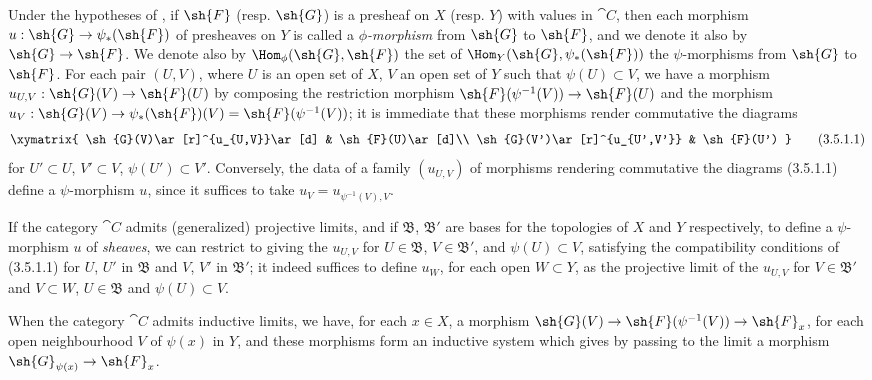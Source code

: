 \begin{env}[3.5.1]
\label{0.3.5.1}
Under the hypotheses of , if $\sh{F}$ (resp. $\sh{G}$) is a
presheaf on $X$ (resp. $Y$) with values in $\cat{C}$, then each morphism
$u:\sh{G}\to\psi_*(\sh{F})$ of presheaves on $Y$ is called a
\emph{$\phi$-morphism} from $\sh{G}$ to $\sh{F}$, and we denote it also by
$\sh{G}\to\sh{F}$. We denote also by $\Hom_\phi(\sh{G},\sh{F})$ the set of
$\Hom_Y(\sh{G},\psi_*(\sh{F}))$ the $\psi$-morphisms from $\sh{G}$ to $\sh{F}$.
For each pair $(U,V)$, where $U$ is an open set of $X$, $V$ an open set of $Y$
such that $\psi(U)\subset V$, we have a morphism $u_{U,V}:\sh{G}(V)\to\sh{F}(U)$
by composing the restriction morphism $\sh{F}(\psi^{-1}(V))\to\sh{F}(U)$ and the
morphism $u_V:\sh{G}(V)\to\psi_*(\sh{F})(V)=\sh{F}(\psi^{-1}(V))$; it is
immediate that these morphisms render commutative the diagrams
\[
\label{0.3.5.1.1}
  \xymatrix{
    \sh{G}(V)\ar[r]^{u_{U,V}}\ar[d] &
    \sh{F}(U)\ar[d]\\
    \sh{G}(V')\ar[r]^{u_{U',V'}} &
    \sh{F}(U')
  }
  \tag{3.5.1.1}
\]
for $U'\subset U$, $V'\subset V$, $\psi(U')\subset V'$. Conversely, the data of
a family $(u_{U,V})$ of morphisms rendering commutative the diagrams (3.5.1.1)
define a $\psi$-morphism $u$, since it suffices to take
$u_V=u_{\psi^{-1}(V),V}$.

If the category $\cat{C}$ admits (generalized) projective limits, and if
$\mathfrak{B}$, $\mathfrak{B}'$ are bases for the topologies of $X$ and $Y$
respectively, to define a $\psi$-morphism $u$ of \emph{sheaves}, we can restrict
to giving the $u_{U,V}$ for $U\in\mathfrak{B}$, $V\in\mathfrak{B}'$, and
$\psi(U)\subset V$, satisfying the compatibility conditions of (3.5.1.1) for
$U$, $U'$ in $\mathfrak{B}$ and $V$, $V'$ in $\mathfrak{B}'$; it indeed suffices
to define $u_W$, for each open $W\subset Y$, as the projective limit of the
$u_{U,V}$ for $V\in\mathfrak{B}'$ and $V\subset W$, $U\in\mathfrak{B}$ and
$\psi(U)\subset V$.

When the category $\cat{C}$ admits inductive limits, we have, for each $x\in X$, a
morphism $\sh{G}(V)\to\sh{F}(\psi^{-1}(V))\to\sh{F}_x$, for each open
neighbourhood $V$ of $\psi(x)$ in $Y$, and these morphisms form an inductive
system which gives by passing to the limit a morphism
$\sh{G}_{\psi(x)}\to\sh{F}_x$.
\end{env}

